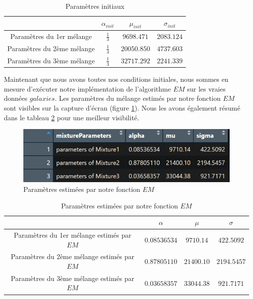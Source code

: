 \documentclass[a4paper,french,10pt]{article}
\begin{document}
\begin{table}[htp]
	\center
	\begin{tabular}{|c||c|c|c|}
		\hline
		& $\alpha_{init}$ & $\mu_{init}$ & $\sigma_{init}$\\
		\hline
		Paramètres du 1er mélange & $\frac{1}{3}$ & $9698.471$ & $2083.124$ \\
		\hline
		Paramètres du 2ème mélange & $\frac{1}{3}$ & $20050.850$ & $4737.603$ \\
		\hline
		Paramètres du 3ème mélange & $\frac{1}{3}$ & $32717.292$ & $2241.339$ \\
		\hline
	\end{tabular}
	\caption{Paramètres initiaux}
	\label{tab5}
\end{table}

Maintenant que nous avons toutes nos conditions initiales, nous sommes en mesure d'exécuter notre implémentation de l'algorithme $EM$ sur les vraies données $galaxies$. Les paramètres du mélange estimés par notre fonction $EM$ sont visibles sur la capture d'écran (figure \ref{res_EM}). Nous les avons également résumé dans le tableau \ref{tab6} pour une meilleur visibilité. 

\begin{figure}[htp] 
	\centering
	\includegraphics[scale=0.8]{images/paramEstEM.png}
	\caption{Paramètres estimées par notre fonction $EM$}
	\label{res_EM}
\end{figure}

\begin{table}[htp]
	\center
	\begin{tabular}{|c||c|c|c|}
		\hline
		& $\alpha$ & $\mu$ & $\sigma$\\
		\hline
		Paramètres du 1er mélange estimés par $EM$ & $0.08536534$ & $9710.14$ & $422.5092$ \\
		\hline
		Paramètres du 2ème mélange estimés par $EM$ & $0.87805110$ & $21400.10$ & $2194.5457$ \\
		\hline
		Paramètres du 3ème mélange estimés par $EM$ & $0.03658357$ & $33044.38$ & $921.7171$ \\
		\hline
	\end{tabular}
	\caption{Paramètres estimées par notre fonction $EM$}
	\label{tab6}
\end{table}
\end{document}
